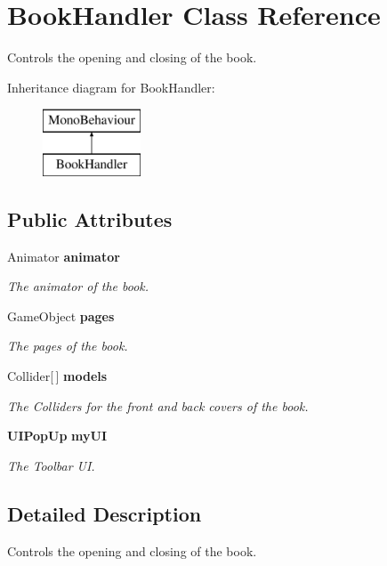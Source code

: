 \section{Book\+Handler Class Reference}
\label{class_book_handler}


Controls the opening and closing of the book.  


Inheritance diagram for Book\+Handler\+:\begin{figure}[H]
\begin{center}
\leavevmode
\includegraphics[height=2.000000cm]{class_book_handler}
\end{center}
\end{figure}
\subsection*{Public Attributes}
\begin{DoxyCompactItemize}
\item 
Animator {\bf animator}
\begin{DoxyCompactList}\small\item\em The animator of the book. \end{DoxyCompactList}\item 
Game\+Object {\bf pages}
\begin{DoxyCompactList}\small\item\em The pages of the book. \end{DoxyCompactList}\item 
Collider[$\,$] {\bf models}
\begin{DoxyCompactList}\small\item\em The Colliders for the front and back covers of the book. \end{DoxyCompactList}\item 
{\bf U\+I\+Pop\+Up} {\bf my\+UI}
\begin{DoxyCompactList}\small\item\em The Toolbar UI. \end{DoxyCompactList}\end{DoxyCompactItemize}


\subsection{Detailed Description}
Controls the opening and closing of the book. 



